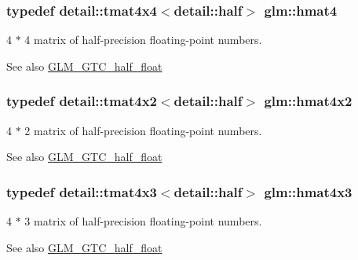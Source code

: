 \subsubsection[{hmat4}]{\setlength{\rightskip}{0pt plus 5cm}typedef detail\+::tmat4x4$<$detail\+::half$>$ {\bf glm\+::hmat4}}\label{group__gtc__half__float_gaf5091515fa8c775f1e511d1e6790e968}
4 $\ast$ 4 matrix of half-\/precision floating-\/point numbers. \begin{DoxySeeAlso}{See also}
\hyperlink{group__gtc__half__float}{G\+L\+M\+\_\+\+G\+T\+C\+\_\+half\+\_\+float} 
\end{DoxySeeAlso}
\hypertarget{group__gtc__half__float_gadaf0a1837917e1b87a5269b379f90e33}{}
\subsubsection[{hmat4x2}]{\setlength{\rightskip}{0pt plus 5cm}typedef detail\+::tmat4x2$<$detail\+::half$>$ {\bf glm\+::hmat4x2}}\label{group__gtc__half__float_gadaf0a1837917e1b87a5269b379f90e33}
4 $\ast$ 2 matrix of half-\/precision floating-\/point numbers. \begin{DoxySeeAlso}{See also}
\hyperlink{group__gtc__half__float}{G\+L\+M\+\_\+\+G\+T\+C\+\_\+half\+\_\+float} 
\end{DoxySeeAlso}
\hypertarget{group__gtc__half__float_ga44cb3a8fb375a76fc6ccb2f0add2bcf2}{}
\subsubsection[{hmat4x3}]{\setlength{\rightskip}{0pt plus 5cm}typedef detail\+::tmat4x3$<$detail\+::half$>$ {\bf glm\+::hmat4x3}}\label{group__gtc__half__float_ga44cb3a8fb375a76fc6ccb2f0add2bcf2}
4 $\ast$ 3 matrix of half-\/precision floating-\/point numbers. \begin{DoxySeeAlso}{See also}
\hyperlink{group__gtc__half__float}{G\+L\+M\+\_\+\+G\+T\+C\+\_\+half\+\_\+float} 
\end{DoxySeeAlso}
\hypertarget{group__gtc__half__float_gabf1d2a56f968368a22222ab03fedf67f}{}
